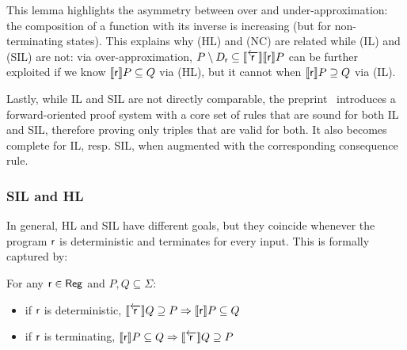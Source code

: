 This lemma highlights the asymmetry between over and under-approximation: the composition of a function with its inverse is increasing (but for non-terminating states).
This explains why (HL) and (NC) are related while (IL) and (SIL) are not: via over-approximation, $P \setminus D_{\mathsf{r}} \subseteq \llbracket\overleftarrow{\mathsf{r}}\rrbracket \llbracket\mathsf{r}\rrbracket P$ can be further exploited if we know $\llbracket\mathsf{r}\rrbracket P \subseteq Q$ via (HL), but it cannot when $\llbracket\mathsf{r}\rrbracket P \supseteq Q$ via (IL).

Lastly, while IL and SIL are not directly comparable, the preprint~\cite{RVO24} introduces a forward-oriented proof system with a core set of rules that are sound for both IL and SIL, therefore proving only triples that are valid for both. It also becomes complete for IL, resp. SIL, when augmented with the corresponding consequence rule.

\subsubsection{SIL and HL}
In general, HL and SIL have different goals, but they coincide whenever the program $\mathsf{r}$ is deterministic and terminates for every input. This is formally captured by:

\begin{prop}\label{prop:sil:sil-hl-deterministic-terminating}
	For any $\mathsf{r}\in \mathsf{Reg}$ and $P, Q \subseteq \Sigma$:
	\begin{itemize}
		\item if $\mathsf{r}$ is deterministic, $\llbracket\overleftarrow{\mathsf{r}}\rrbracket Q \supseteq P \Rightarrow \llbracket\mathsf{r}\rrbracket P \subseteq Q$
		\item if $\mathsf{r}$ is terminating, $\llbracket\mathsf{r}\rrbracket P \subseteq Q \Rightarrow \llbracket\overleftarrow{\mathsf{r}}\rrbracket Q \supseteq P$
	\end{itemize}
\end{prop}



